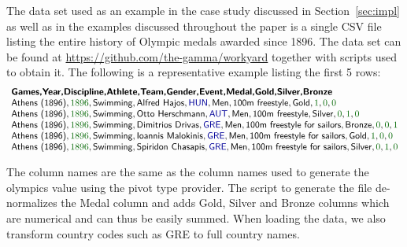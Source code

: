 \documentclass[a4paper,UKenglish]{lipics-v2016}
\theoremstyle{plain}
\theoremstyle{definition}
\newcommand{\num}[1]{\textcolor{numclr}{#1}}
\newcommand{\kvd}[1]{\textnormal{\textcolor{kvdclr}{\sffamily #1}}}
\newcommand{\ident}[1]{\textnormal{\sffamily #1}}
\begin{document}
The data set used as an example in the case study discussed in Section~\ref{sec:impl} as well as
in the examples discussed throughout the paper is a single CSV file listing the entire history of
Olympic medals awarded since 1896. The data set can be found at \url{https://github.com/the-gamma/workyard}
together with scripts used to obtain it. The following is a representative example listing the
first 5 rows:
%
{\small
\begin{equation*}
\begin{array}{l}
\textbf{\sffamily {Games},{Year},{Discipline},{Athlete},{Team},{Gender},{Event},{Medal},{Gold},{Silver},{Bronze}}\\
\ident{Athens (1896)},\num{1896},\ident{Swimming},\ident{Alfred Hajos},\kvd{HUN},\ident{Men},\ident{100m freestyle},\ident{Gold},\num{1},\num{0},\num{0}\\
\ident{Athens (1896)},\num{1896},\ident{Swimming},\ident{Otto Herschmann},\kvd{AUT},\ident{Men},\ident{100m freestyle},\ident{Silver},\num{0},\num{1},\num{0}\\
\ident{Athens (1896)},\num{1896},\ident{Swimming},\ident{Dimitrios Drivas},\kvd{GRE},\ident{Men},\ident{100m freestyle for sailors},\ident{Bronze},\num{0},\num{0},\num{1}\\
\ident{Athens (1896)},\num{1896},\ident{Swimming},\ident{Ioannis Malokinis},\kvd{GRE},\ident{Men},\ident{100m freestyle for sailors},\ident{Gold},\num{1},\num{0},\num{0}\\
\ident{Athens (1896)},\num{1896},\ident{Swimming},\ident{Spiridon Chasapis},\kvd{GRE},\ident{Men},\ident{100m freestyle for sailors},\ident{Silver},\num{0},\num{1},\num{0}\\
\end{array}
\end{equation*} }

\noindent
The column names are the same as the column names used to generate the \ident{olympics} value using
the pivot type provider. The script to generate the file de-normalizes the \ident{Medal} column
and adds \ident{Gold}, \ident{Silver} and \ident{Bronze} columns which are numerical and can thus
be easily summed. When loading the data, we also transform country codes such as \kvd{GRE} to
full country names.
\end{document}
